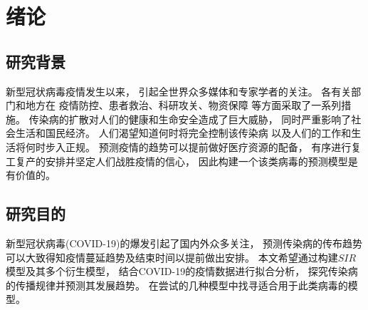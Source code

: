 \section{绪论}
\subsection{研究背景}
新型冠状病毒疫情发生以来，
引起全世界众多媒体和专家学者的关注。
各有关部门和地方在
疫情防控、患者救治、科研攻关、物资保障
等方面采取了一系列措施。
传染病的扩散对人们的健康和生命安全造成了巨大威胁，
同时严重影响了社会生活和国民经济。
人们渴望知道何时将完全控制该传染病
以及人们的工作和生活将何时步入正规。
预测疫情的趋势可以提前做好医疗资源的配备，
有序进行复工复产的安排并坚定人们战胜疫情的信心，
因此构建一个该类病毒的预测模型是有价值的。
\subsection{研究目的}
新型冠状病毒(COVID-19)的爆发引起了国内外众多关注，
预测传染病的传布趋势可以大致得知疫情蔓延趋势及结束时间以提前做出安排。
本文希望通过构建$SIR$模型及其多个衍生模型，
结合COVID-19的疫情数据进行拟合分析，
探究传染病的传播规律并预测其发展趋势。
在尝试的几种模型中找寻适合用于此类病毒的模型。